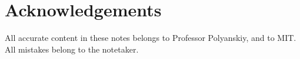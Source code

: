 \section*{Acknowledgements}

All accurate content in these notes belongs to Professor Polyanskiy, and to MIT.
All mistakes belong to the notetaker. 
